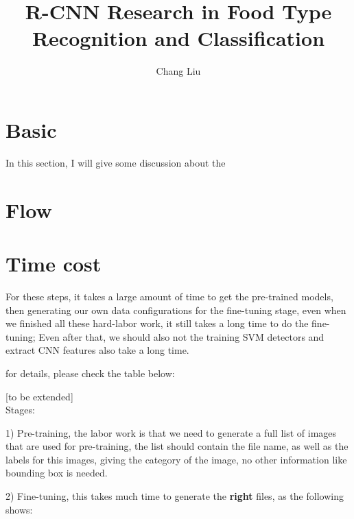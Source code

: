 \documentclass[a4]{article}
\title{R-CNN Research in Food Type Recognition and Classification}
\author{Chang Liu}
\begin{document}
\maketitle

\tableofcontents

\newpage



\section{Basic}

In this section, I will give some discussion about the 


\section{Flow}



\section{Time cost}
For these steps, it takes a large amount of time to get the pre-trained models, then generating our own data configurations for the fine-tuning stage, even when we finished all these hard-labor work, it still takes a long time to do the fine-tuning; Even after that, we should also not the training SVM detectors and extract CNN features also take a long time.

for details, please check the table below:

[to be extended]
~\\

Stages:

1) Pre-training, the labor work is that we need to generate a full list of images that are used for pre-training, the list should contain the file name, as well as the labels for this images, giving the category of the image, no other information like bounding box is needed.

2) Fine-tuning, this takes much time to generate the \textbf{right} files, as the following shows:
\end{document}
